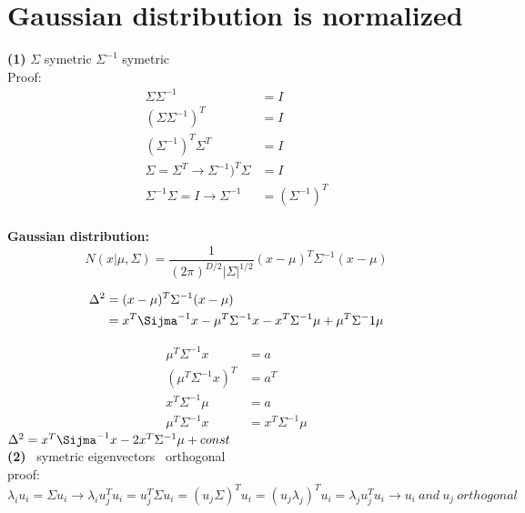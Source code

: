 \documentclass[12pt,letterpaper]{article}
\begin{document}
    \section{Gaussian distribution is normalized}
	\textbf{(1)} \(\Sigma\) symetric \rightarrow \(\Sigma^{-1}\) symetric\\
	Proof:
		\begin{equation*}
		    \begin{split}
		        \Sigma\Sigma^{-1} &= I\\
		        (\Sigma\Sigma^{-1})^T &= I\\
		        (\Sigma^{-1})^T\Sigma^T &= I\\
		        \Sigma = \Sigma^T \rightarrow \Sigma^{-1})^T\Sigma &= I\\
	            \Sigma^{-1}\Sigma = I \rightarrow \Sigma^{-1} &= (\Sigma^{-1})^T\\
		    \end{split}
		\end{equation*}
	
	
	\textbf{Gaussian distribution:} \[N(x|\mu,\Sigma) = \frac{1}{(2\pi)^{D/2}|\Sigma|^{1/2}}(x-\mu)^T\Sigma^{-1}(x-\mu)\]
	
	\begin{equation*}
	    \begin{split}
	        \Delta^2 &= (x - \mu)^T\Sigma^{-1}(x-\mu)\\
                     &= x^T\Sijma^{-1}x - \mu^T\Sigma^{-1}x - x^T\Sigma^{-1}\mu + \mu^T\Sigma^-1\mu
	    \end{split}
	\end{equation*}
	
	\begin{equation*}
	    \begin{split}
	        \mu^T\Sigma^{-1}x &= a\\
	        (\mu^T\Sigma^{-1}x)^T &= a^T\\
	        x^T\Sigma^{-1}\mu &= a\\
	        \mu^T\Sigma^{-1}x &= x^T\Sigma^{-1}\mu
	    \end{split}
	\end{equation*}
	\rightarrow \(\Delta^2 =  x^T\Sijma^{-1}x -2x^T\Sigma^{-1}\mu + const\)\\
	
	\textbf{(2)} \Sigma \ symetric \rightarrow eigenvectors \ orthogonal\\
	proof:\\
	\begin{equation*}
	    \lambda_i u_i = \Sigma u_i \rightarrow \lambda_i u_j^Tu_i = u_j^T\Sigma u_i = (u_j\Sigma)^Tu_i = (u_j\lambda_j)^Tu_i = \lambda_j u_j^Tu_i
	    \rightarrow u_i \ and \ u_j \ orthogonal
	\end{equation*}
	
\end{document}
